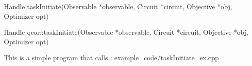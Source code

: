 
\begin{apidefinition}

\begin{Csynopsis}
Handle taskInitiate(Observable *observable, Circuit *circuit, Objective *obj, Optimizer opt)

\end{Csynopsis}
Handle qcor::taskInitiate(Observable *observable, Circuit *circuit, Objective *obj, Optimizer opt)

\begin{Cppsynopsis}

\end{Cppsynopsis}


\begin{apiarguments}
    \apiargument{}{}{}
\end{apiarguments}

\apidescription{
    
}


\apinotes{
    
}

\begin{apiexamples}

\apicppexample
    { This is a simple program that calls : } 
    { example_code/taskInitiate_ex.cpp} 
    {}

\end{apiexamples}

\end{apidefinition}

